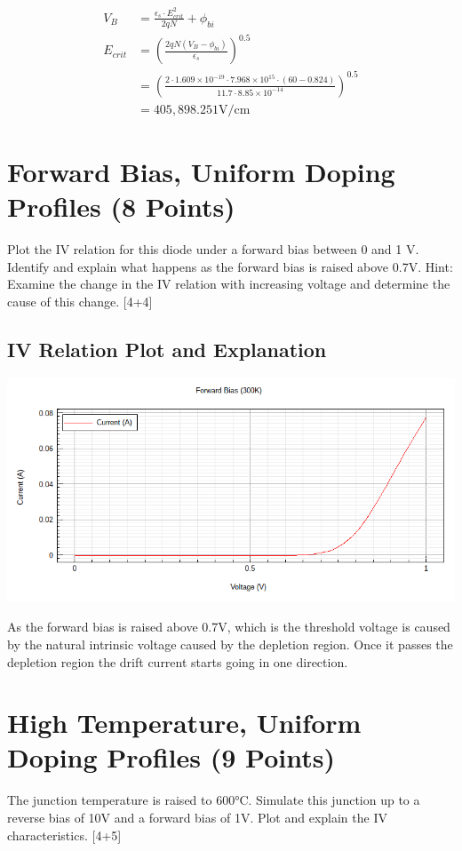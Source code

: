 \documentclass[12pt]{article}
\newcommand{\e}[1]{\times 10^{#1}}
\begin{document}
\begin{align*} 
V_B &= \frac{\epsilon_s \cdot E^2_{crit}}{2qN} + \phi_{bi}\\
E_{crit} &= (\frac{2qN(V_B-\phi_{bi})}{\epsilon_s})^{0.5}\\
&= (\frac{2 \cdot 1.609\e{-19} \cdot 7.968 \e{15} \cdot (60 - 0.824)}{11.7 \cdot 8.85\e{-14}})^{0.5}\\
&= 405,898.251 \text{V/cm}
\end{align*}

\section{Forward Bias, Uniform Doping Profiles (8 Points)}

Plot the IV relation for this diode under a forward bias between 0 and 1 V. Identify and explain what happens as the forward bias is raised above 0.7V.
Hint: Examine the change in the IV relation with increasing voltage and determine the cause of this change. [4+4]

\subsection{IV Relation Plot and Explanation}
\includegraphics[width=\textwidth]{3a.png}

As the forward bias is raised above 0.7V, which is the threshold voltage is caused by the natural intrinsic voltage caused by the depletion region. Once it passes the depletion region the drift current starts going in one direction. 

\section {High Temperature, Uniform Doping Profiles (9 Points)}
The junction temperature is raised to 600°C. Simulate this junction up to a reverse bias of 10V and a forward bias of 1V. Plot and explain the IV characteristics. [4+5]
\end{document}
